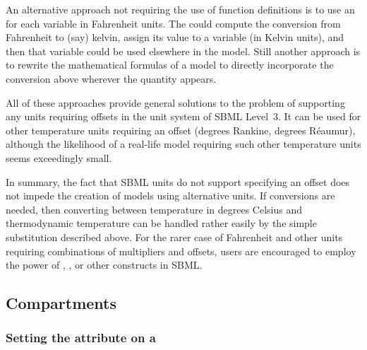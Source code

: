 \begin{itemize}
  An alternative approach not requiring the use of function
  definitions is to use an \AssignmentRule for each variable in
  Fahrenheit units.  The \AssignmentRule could compute the
  conversion from Fahrenheit to (say) kelvin, assign its value to
  a variable (in Kelvin units), and then that variable could be
  used elsewhere in the model.  Still another approach is to
  rewrite the mathematical formulas of a model to directly
  incorporate the conversion above wherever
  the quantity appears.

  All of these approaches provide general solutions to the problem
  of supporting any units requiring offsets in the unit system of
  SBML Level~3.  It can be used for other temperature units
  requiring an offset (\eg degrees Rankine, degrees R\'{e}aumur),
  although the likelihood of a real-life model requiring such
  other temperature units seems exceedingly small.

\end{itemize}

In summary, the fact that SBML units do not support specifying an offset 
does  not impede the creation of models using alternative units.  If
conversions are needed, then converting between temperature in
degrees Celsius and thermodynamic temperature can be handled
rather easily by the simple substitution described above.  For the
rarer case of Fahrenheit and other units requiring combinations of
multipliers and offsets, users are encouraged to employ the power
of \FunctionDefinition, \AssignmentRule, or other constructs in
SBML.



\subsection{Compartments}
\label{sec:bp:compartment}


\subsubsection{Setting the  attribute on a }
\label{sec:bp:size}

